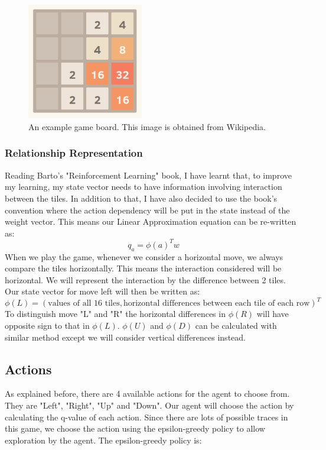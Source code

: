 \begin{figure}
	\centering
	\includegraphics[width=2.0in]{2048_Screenshot}
	\caption{An example game board. This image is obtained from Wikipedia.}
	\label{fig:game_board}
\end{figure}

\subsubsection{Relationship Representation}
Reading Barto's "Reinforcement Learning" book, I have learnt that, to improve my learning, my state vector needs to have information involving interaction between the tiles. In addition to that, I have also decided to use the book's convention where the action dependency will be put in the state instead of the weight vector. This means our Linear Approximation equation can be re-written as:
\begin{equation*}
q_{a} = \phi(a)^{T} w
\end{equation*}
When we play the game, whenever we consider a horizontal move, we always compare the tiles horizontally.  This means the interaction considered will be horizontal. We will represent the interaction by the difference between 2 tiles. Our state vector for move left will then be written as:
\begin{equation*}
\phi(L) = (\mbox{values of all 16 tiles}, \mbox{horizontal differences between each tile of each row})^{T}
\end{equation*}
To distinguish move "L" and "R" the horizontal differences in $\phi(R)$ will have opposite sign to that in $\phi(L)$. $\phi(U)$ and $\phi(D)$ can be calculated with similar method except we will consider vertical differences instead.  

\subsection{Actions}
As explained before, there are 4 available actions for the agent to choose from. They are "Left", "Right", "Up" and "Down". Our agent will choose the action by calculating the q-value of each action. Since there are lots of possible traces in this game, we choose the action using the epsilon-greedy policy to allow exploration by the agent. The epsilon-greedy policy is:

